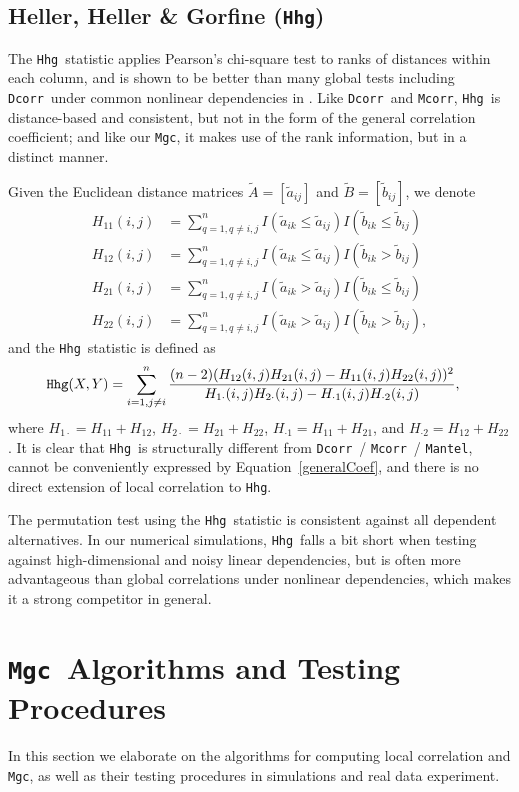 \documentclass[11pt]{article}
\providecommand{\sct}[1]{{\sc \texttt{#1}}}
\newcommand{\Mgc}{\sct{Mgc}}
\newcommand{\Hhg}{\sct{Hhg}}
\newcommand{\Dcorr}{\sct{Dcorr}}
\newcommand{\Mcorr}{\sct{Mcorr}}
\newcommand{\Mantel}{\sct{Mantel}}
\begin{document}
\subsection{Heller, Heller \& Gorfine (\Hhg)}
\label{appen:hhg}
The \Hhg~statistic applies Pearson's chi-square test to ranks of distances within each column, and is shown to be better than many global tests including \Dcorr~under common nonlinear dependencies in \cite{GorfineHellerHeller2012, HellerGorfine2013}. Like \Dcorr~and \Mcorr, \Hhg~is distance-based and consistent, but not in the form of the general correlation coefficient; and like our \Mgc, it makes use of the rank information, but in a distinct manner.

Given the Euclidean distance matrices $\tilde{A}=[\tilde{a}_{ij}]$ and $\tilde{B}=[\tilde{b}_{ij}]$, we denote
\begin{align*}
H_{11}(i,j) &= \sum_{q=1,q\neq i,j}^{n}I(\tilde{a}_{ik} \leq \tilde{a}_{ij})I(\tilde{b}_{ik} \leq \tilde{b}_{ij}) \\
H_{12}(i,j) &= \sum_{q=1,q\neq i,j}^{n}I(\tilde{a}_{ik} \leq \tilde{a}_{ij})I(\tilde{b}_{ik} > \tilde{b}_{ij}) \\
H_{21}(i,j) &= \sum_{q=1,q\neq i,j}^{n}I(\tilde{a}_{ik} > \tilde{a}_{ij})I(\tilde{b}_{ik} \leq \tilde{b}_{ij}) \\
H_{22}(i,j) &= \sum_{q=1,q\neq i,j}^{n}I(\tilde{a}_{ik} > \tilde{a}_{ij})I(\tilde{b}_{ik} > \tilde{b}_{ij}),
\end{align*}
and the \Hhg~statistic is defined as
\begin{align*}
\Hhg(X,Y) &= \sum_{i=1,j\neq i}^{n} \frac{(n-2)(H_{12}(i,j)H_{21}(i,j)-H_{11}(i,j)H_{22}(i,j))^2}{H_{1 \cdot}(i,j)H_{2 \cdot}(i,j)-H_{\cdot 1}(i,j)H_{\cdot 2}(i,j)},
\end{align*}
where $H_{1 \cdot}=H_{11}+H_{12}$, $H_{2 \cdot}=H_{21}+H_{22}$, $H_{\cdot 1}=H_{11}+H_{21}$, and $H_{\cdot 2}=H_{12}+H_{22}$. It is clear that \Hhg~is structurally different from \Dcorr~/ \Mcorr~/ \Mantel, cannot be conveniently expressed by Equation~\ref{generalCoef}, and there is no direct extension of local correlation to \Hhg.

The permutation test using the \Hhg~statistic is consistent against all dependent alternatives. In our numerical simulations, \Hhg~falls a bit short when testing against high-dimensional and noisy linear dependencies, but is often more advantageous than global correlations under nonlinear dependencies, which makes it a strong competitor in general. 

\section{\Mgc~Algorithms and Testing Procedures}
\label{appen:tests}
In this section we elaborate on the algorithms for computing local correlation and \Mgc, as well as their testing procedures in simulations and real data experiment. 
\end{document}
